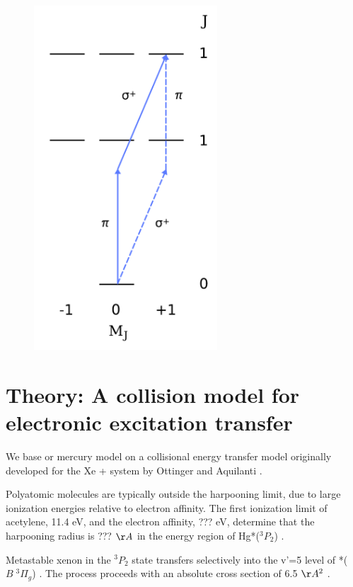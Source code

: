\documentclass[12pt]{mitthesis}
\begin{document}
\begin{figure}
  \includegraphics[width=2.7in]{hg-forbidden-perppol.pdf}
\end{figure}

\section{Theory: A collision model for electronic excitation transfer}

We base or mercury model on a collisional energy transfer model
originally developed for the Xe +  system by Ottinger and
Aquilanti \cite{aquilanti90, aquilanti94}.  

Polyatomic molecules are typically outside the harpooning limit, due
to large ionization energies relative to electron affinity.  The first
ionization limit of acetylene, 11.4 eV, and the electron affinity, ???
eV, determine that the harpooning radius is ??? $\AA$ in the energy
region of Hg*($^3P_2$) \cite{ono82}.

Metastable xenon in the $^3P_2$ state transfers selectively into the
v'=5 level of *($B\; ^3\Pi_g$) \cite{krumpelmann87,
  krumpelmann88, ottinger95b, aardema94}.  The process proceeds with
an absolute cross section of 6.5 $\AA^2$ \cite{bohle89}.
\end{document}
